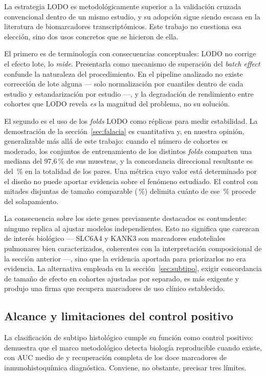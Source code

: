 La estrategia LODO es metodológicamente superior a la validación cruzada
convencional dentro de un mismo estudio, y su adopción sigue siendo escasa en la
literatura de biomarcadores transcriptómicos. Este trabajo no cuestiona esa
elección, sino dos usos concretos que se hicieron de ella.

El primero es de terminología con consecuencias conceptuales: LODO no corrige el
efecto lote, lo \emph{mide}. Presentarla como mecanismo de superación del
\emph{batch effect} confunde la naturaleza del procedimiento. En el pipeline
analizado no existe corrección de lote alguna --- solo normalización por
cuantiles dentro de cada estudio y estandarización por estudio ---, y la
degradación de rendimiento entre cohortes que LODO revela \emph{es} la magnitud
del problema, no su solución.

El segundo es el uso de los \emph{folds} LODO como réplicas para medir
estabilidad. La demostración de la sección~\ref{sec:falacia} es cuantitativa y,
en nuestra opinión, generalizable más allá de este trabajo: cuando el número de
cohortes es moderado, los conjuntos de entrenamiento de los distintos
\emph{folds} comparten una mediana del 97,6\,\% de sus muestras, y la
concordancia direccional resultante es del \conclodo\,\% en la totalidad de los
pares. Una métrica cuyo valor está determinado por el diseño no puede aportar
evidencia sobre el fenómeno estudiado. El control con mitades disjuntas de
tamaño comparable (\concdisjunta\,\%) delimita cuánto de ese \conclodo\,\% procede del
solapamiento.

La consecuencia sobre los siete genes previamente destacados es contundente:
ninguno replica al ajustar modelos independientes. Esto no significa que carezcan
de interés biológico --- SLC6A4 y KANK3 son marcadores endoteliales pulmonares
bien caracterizados, coherentes con la interpretación composicional de la
sección anterior ---, sino que la evidencia aportada para priorizarlos no era
evidencia. La alternativa empleada en la sección~\ref{sec:subtipo}, exigir
concordancia de tamaño de efecto en cohortes ajustadas por separado, es más
exigente y produjo una firma que recupera marcadores de uso clínico establecido.

\subsection{Alcance y limitaciones del control positivo}
\label{sec:disc-subtipo}

La clasificación de subtipo histológico cumple su función como control positivo:
demuestra que el marco metodológico detecta biología reproducible cuando existe,
con AUC medio de \aucsub{} y recuperación completa de los doce marcadores de
inmunohistoquímica diagnóstica. Conviene, no obstante, precisar tres límites.


